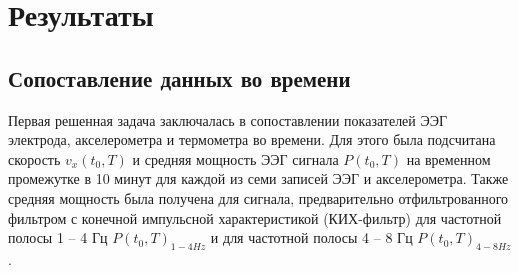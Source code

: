 \documentclass[12pt,a4paper,oneside]{article}
\begin{document}
\section{Результаты} %

\subsection{Сопоставление данных во времени}

Первая решенная задача заключалась в сопоставлении показателей ЭЭГ электрода, акселерометра и термометра во времени. Для этого была подсчитана скорость $v_{x}(t_0, T)$ и средняя мощность ЭЭГ сигнала $P(t_0, T)$ на временном промежутке в 10 минут для каждой из семи записей ЭЭГ и акселерометра. Также средняя мощность была получена для сигнала, предварительно отфильтрованного фильтром с конечной импульсной характеристикой (КИХ-фильтр) для частотной полосы 1 -- 4 Гц $P(t_0, T)_{1-4Hz}$ и для частотной полосы 4 -- 8 Гц $P(t_0, T)_{4-8Hz}$. 
\end{document}
